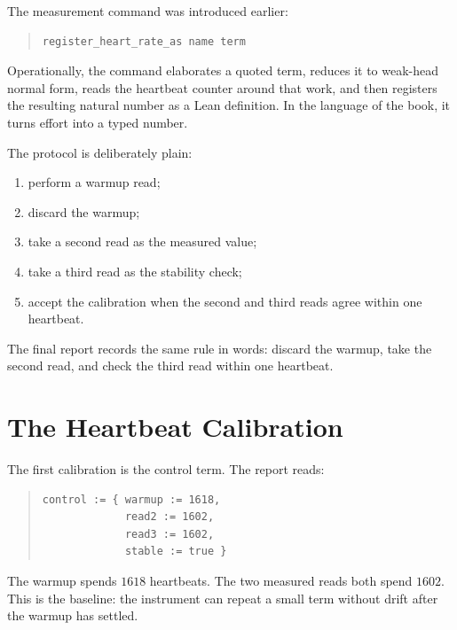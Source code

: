 The measurement command was introduced earlier:
\begin{quote}\small
\begin{verbatim}
register_heart_rate_as name term
\end{verbatim}
\end{quote}
Operationally, the command elaborates a quoted term, reduces it to weak-head normal form, reads the heartbeat
counter around that work, and then registers the resulting natural number as a Lean definition. In the language
of the book, it turns effort into a typed number.

The protocol is deliberately plain:
\begin{enumerate}
\item perform a warmup read;
\item discard the warmup;
\item take a second read as the measured value;
\item take a third read as the stability check;
\item accept the calibration when the second and third reads agree within one heartbeat.
\end{enumerate}
The final report records the same rule in words: discard the warmup, take the second read, and check the third
read within one heartbeat.

\section{The Heartbeat Calibration}

The first calibration is the control term. The report reads:
\begin{quote}\small
\begin{verbatim}
control := { warmup := 1618,
             read2 := 1602,
             read3 := 1602,
             stable := true }
\end{verbatim}
\end{quote}
The warmup spends \(1618\) heartbeats. The two measured reads both spend \(1602\). This is the baseline: the
instrument can repeat a small term without drift after the warmup has settled.

